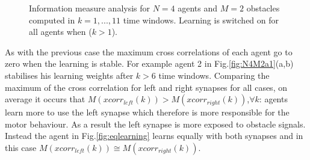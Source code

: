\begin{figure}[htbp]
  \begin{center}
	\hspace{1pt}
    \caption[Max correlation for 4 learning agents B]{
	Information measure analysis for $N=4$ agents and $M=2$ obstacles computed
	in $k=1,...,11$ time windows. Learning is switched on for all agents
	when ($k>1$). \label{fig:N4M2b2}}
  \end{center}
\end{figure}

As with the previous case the maximum cross correlations of each agent go
to zero when the learning is stable.
For example agent 2 in Fig.\ref{fig:N4M2a1}(a,b) stabilises his learning weights
after $k>6$ time windows.
Comparing the maximum of the cross correlation for left and right synapses for all cases,
on average it occurs that $M(xcorr_{left}(k))>M(xcorr_{right}(k))$,$\forall k$:
agents learn more to use the left synapse which therefore is more responsible for the motor
behaviour. As a result the left synapse is more exposed to obstacle signals.
Instead the agent in Fig.\ref{fig:eqlearning} learns equally with both synapses
and in this case $M(xcorr_{left}(k))\cong M(xcorr_{right}(k))$.

